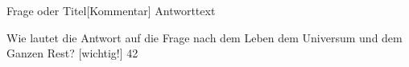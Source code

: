 \documentclass[a7paper]{kartei}
\begin{document}
\begin{karte}[Fach]{Frage oder Titel}[Kommentar]  
	Antworttext
\end{karte}
\begin{karte}[Lebensphilosophie]
	{Wie lautet die Antwort auf die Frage nach dem Leben dem Universum und dem Ganzen Rest?}
	[wichtig!]
	42
\end{karte}
\end{document}
